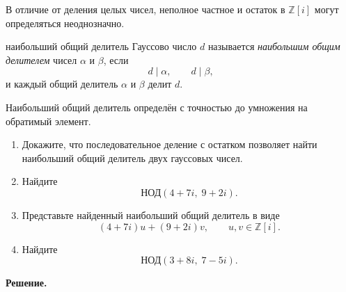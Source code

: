 \medskip

\begin{remarkbox}
В отличие от деления целых чисел, неполное частное и остаток
в $\mathbb Z[i]$ могут определяться неоднозначно.
\end{remarkbox}

\begin{defbox}{наибольший общий делитель}
Гауссово число $d$ называется \emph{наибольшим общим делителем}
чисел $\alpha$ и $\beta$, если
\[
    d\mid\alpha,\qquad d\mid\beta,
\]
и каждый общий делитель $\alpha$ и $\beta$ делит $d$.

Наибольший общий делитель определён с точностью до умножения на
обратимый элемент.
\end{defbox}


\begin{enumerate}[label=\textbf{\alph*)}, leftmargin=8mm]
    \item Докажите, что последовательное деление с остатком позволяет
    найти наибольший общий делитель двух гауссовых чисел.

    \item Найдите
    \[
        \text{НОД}(4+7i,\;9+2i).
    \]

    \item Представьте найденный наибольший общий делитель в виде
    \[
        (4+7i)u+(9+2i)v,
        \qquad u,v\in\mathbb Z[i].
    \]

    \item Найдите
    \[
        \text{НОД}(3+8i,\;7-5i).
    \]
\end{enumerate}

\smallskip
\textbf{Решение.}

